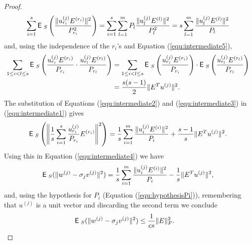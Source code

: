 \documentclass{book}
\numberwithin{exercise}{chapter}
\begin{document}
\begin{proof}
\begin{equation}
\sum_{i=1}^s \hbox{{\sf E}\;}_S\left(\frac{\|u_{r_i}^{(j)}
E^{(r_i)}\|^2}{P_{r_i}^2}\right)
    = \sum_{i=1}^s \sum_{l=1}^m P_l
\frac{\|u_{l}^{(j)} E^{(l)}\|^2}{P_{l}^2}
     = s \sum_{l=1}^m \frac{\|u_l^{(j)}E^{(l)}\|^2}{P_l}
\end{equation}
and, using the independence of the $r_i$'s and Equation
(\ref{equ:intermediate5}),
\begin{equation}\label{equ:intermediate3}
\begin{aligned}
\sum_{1\le i<l\le s} \hbox{{\sf E}\;}_S \left(\frac{u_{r_i}^{(j)}
E^{(r_i)}}{P_{r_i}} \cdot \frac{u_{r_l}^{(j)}
E^{(r_l)}}{P_{r_l}}\right)
    &= \sum_{1\le i<l\le s} \hbox{{\sf E}\;}_S \left(\frac{u_{r_i}^{(j)}
E^{(r_i)}}{P_{r_i}}\right) \cdot \hbox{{\sf E}\;}_S \left(\frac{u_{r_l}^{(j)}
E^{(r_l)}}{P_{r_l}}\right)\\
    &= \frac{s(s-1)}{2}
\|E^T u^{(j)}\|^2.
\end{aligned}
\end{equation}
The substitution of Equations (\ref{equ:intermediate2}) and
(\ref{equ:intermediate3}) in (\ref{equ:intermediate1}) gives
\[
\hbox{{\sf E}\;}_{S}\left(\left\|\frac{1}{s}\sum_{i=1}^s
\frac{u_{r_i}^{(j)}}{P_{r_i}} E^{(r_i)}\right\|^2 \right)
    = \frac{1}{s} \sum_{i=1}^m \frac{\|u_i^{(j)}E^{(i)}\|^2}{P_i}
    + \frac{s-1}{s} \|E^T
u^{(j)}\|^2.
\]
Using this in Equation (\ref{equ:intermediate4}) we have
\[
\hbox{{\sf E}\;}_{S} (\|w^{(j)} - \sigma_j v^{(j)}\|^2) = \frac{1}{s}
\sum_{i=1}^m \frac{\|u_i^{(j)}E^{(i)}\|^2}{P_i} -\frac{1}{s}
\|E^T u^{(j)}\|^2,
\]
and, using the hypothesis for $P_i$ (Equation
(\ref{equ:hypothesisPi})), remembering that $u^{(j)}$ is a unit
vector and discarding the second term we conclude
\begin{equation}\label{equ:variance}
\begin{aligned}
\hbox{{\sf E}\;}_{S} (\|w^{(j)} - \sigma_j v^{(j)}\|^2)
    &\leq \frac{1}{cs} \|E\|_{F}^2.
\end{aligned}
\end{equation}


\end{proof}
\end{document}
